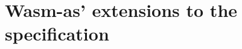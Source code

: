 \documentclass[10pt]{article}
\begin{document}
\section{Wasm-as' extensions to the specification}\label{wasmasex}
\end{document}
